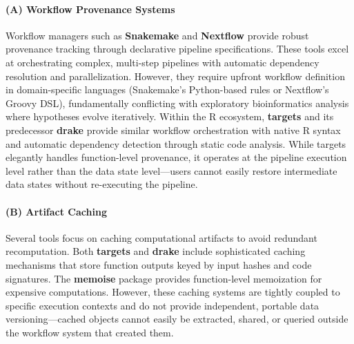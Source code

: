 \documentclass[11pt,a4paper]{article}
\begin{document}
\paragraph{(A) Workflow Provenance Systems}
Workflow managers such as \textbf{Snakemake} \citep{koster2012snakemake} and \textbf{Nextflow} \citep{di2017nextflow} provide robust provenance tracking through declarative pipeline specifications. These tools excel at orchestrating complex, multi-step pipelines with automatic dependency resolution and parallelization. However, they require upfront workflow definition in domain-specific languages (Snakemake's Python-based rules or Nextflow's Groovy DSL), fundamentally conflicting with exploratory bioinformatics analysis where hypotheses evolve iteratively. Within the R ecosystem, \textbf{targets} \citep{landau2021targets} and its predecessor \textbf{drake} \citep{landau2018drake} provide similar workflow orchestration with native R syntax and automatic dependency detection through static code analysis. While targets elegantly handles function-level provenance, it operates at the pipeline execution level rather than the data state level---users cannot easily restore intermediate data states without re-executing the pipeline.

\paragraph{(B) Artifact Caching}
Several tools focus on caching computational artifacts to avoid redundant recomputation. Both \textbf{targets} and \textbf{drake} include sophisticated caching mechanisms that store function outputs keyed by input hashes and code signatures. The \textbf{memoise} package \citep{memoise2024} provides function-level memoization for expensive computations. However, these caching systems are tightly coupled to specific execution contexts and do not provide independent, portable data versioning---cached objects cannot easily be extracted, shared, or queried outside the workflow system that created them.
\end{document}
